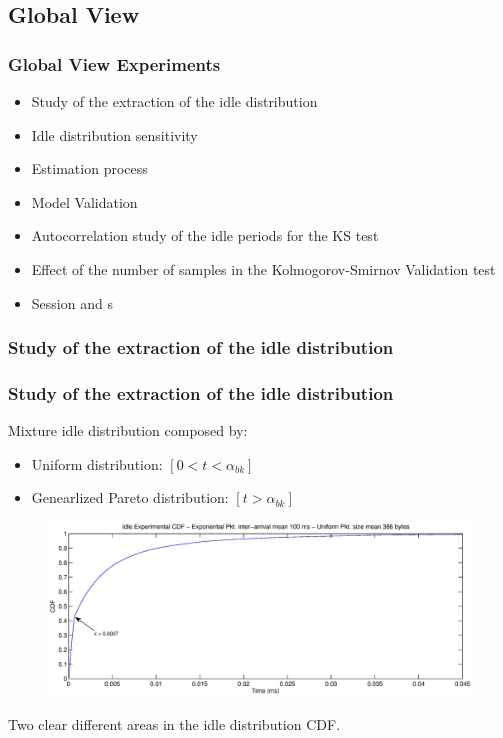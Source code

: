 \documentclass[9pt,handout,serif]{beamer}
\begin{document}
\subsection{Global View}
\begin{frame}[c]
	\frametitle{Global View Experiments}
	\begin{itemize}
		\item Study of the extraction of the idle distribution
		\item Idle distribution sensitivity
		\item Estimation process
		\item Model Validation
		\item Autocorrelation study of the idle periods for the KS test
		\item Effect of the number of samples in the Kolmogorov-Smirnov Validation test
		\item Session and s
	\end{itemize}
\end{frame}

\subsubsection*{Study of the extraction of the idle distribution}
\begin{frame}[c]
 	\frametitle{Study of the extraction of the idle distribution}
	Mixture idle distribution composed by:
	\begin{itemize}
		\item Uniform distribution: $[0 < t < \alpha_{bk}]$
		\item Genearlized Pareto distribution: $[t > \alpha_{bk}]$
	\end{itemize}
	\begin{figure}
		\includegraphics[width=\textwidth]{../images/results/GlobalView/cdf_globalview}
	\end{figure}
	Two clear different areas in the idle distribution CDF.
\end{frame}
\end{document}
